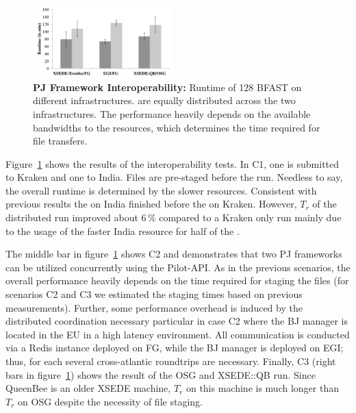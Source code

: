 \documentclass[conference]{IEEEtran}
\begin{document}
\begin{figure}[htbp]
  	\centering
	\includegraphics[width=0.48\textwidth]{../perf/interop/128-bfast-interop-with-staging.pdf}
	\caption{\textbf{PJ Framework Interoperability:} Runtime of
        128 BFAST \cus on different infrastructures. \cus are
        equally distributed across the two infrastructures. The performance 
		heavily depends on the available bandwidths to the resources, which 
		determines the time required for file transfers. }
	\label{fig:perf_interop_128-bfast-interop}
\end{figure}


Figure~\ref{fig:perf_interop_128-bfast-interop} shows the results of
the interoperability tests. In C1, one \pilot is submitted to Kraken
and one to India. Files are pre-staged before the run. Needless to
say, the overall runtime is determined by the slower
resources. Consistent with previous results the \pilot on India
finished before the \pilot on Kraken. However, $T_r$ of the
distributed run improved about 6\,\% compared to a Kraken only run
mainly due to the usage of the faster India resource for half of the
\cus.



The middle bar in figure~\ref{fig:perf_interop_128-bfast-interop} shows C2 and
demonstrates that two PJ frameworks can be utilized concurrently using the
Pilot-API. As in the previous scenarios, the overall performance heavily
depends on the time required for staging the files (for scenarios C2 and C3 we
estimated the staging times based on previous measurements). Further, some
performance overhead is induced by the distributed coordination necessary
particular in case C2 where the BJ manager is located in the EU in a high
latency environment. All communication is conducted via a Redis instance
deployed on FG, while the BJ manager is deployed on EGI; thus, for each \cu
several cross-atlantic roundtrips are necessary.
Finally, C3 (right bars in figure~\ref{fig:perf_interop_128-bfast-interop})
shows the result of the OSG and XSEDE::QB run. Since QueenBee is an older
XSEDE machine, $T_r$ on this machine is much longer than $T_r$ on OSG despite
the necessity of file staging.
\end{document}
